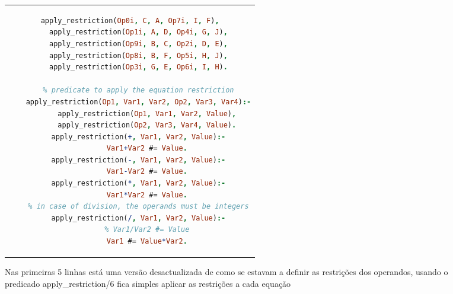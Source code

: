 \begin{figure}
    \centering
    \begin{tabular}{c}
    \begin{lstlisting}[language=Prolog]
    apply_restriction(Op0i, C, A, Op7i, I, F),
    apply_restriction(Op1i, A, D, Op4i, G, J),
    apply_restriction(Op9i, B, C, Op2i, D, E),
    apply_restriction(Op8i, B, F, Op5i, H, J),
    apply_restriction(Op3i, G, E, Op6i, I, H).
    
    % predicate to apply the equation restriction
    apply_restriction(Op1, Var1, Var2, Op2, Var3, Var4):-
        apply_restriction(Op1, Var1, Var2, Value),
        apply_restriction(Op2, Var3, Var4, Value).
    apply_restriction(+, Var1, Var2, Value):-
        Var1+Var2 #= Value.
    apply_restriction(-, Var1, Var2, Value):-
        Var1-Var2 #= Value.
    apply_restriction(*, Var1, Var2, Value):-
        Var1*Var2 #= Value.
    % in case of division, the operands must be integers
    apply_restriction(/, Var1, Var2, Value):-
        % Var1/Var2 #= Value
        Var1 #= Value*Var2.
    \end{lstlisting}
    \end{tabular}
    \caption{Nas primeiras 5 linhas está uma versão desactualizada de como se estavam a definir as restrições dos operandos, usando o predicado apply\_restriction/6 fica simples aplicar as restrições a cada equação}
    \label{code:predicados_restricoes}
\end{figure}